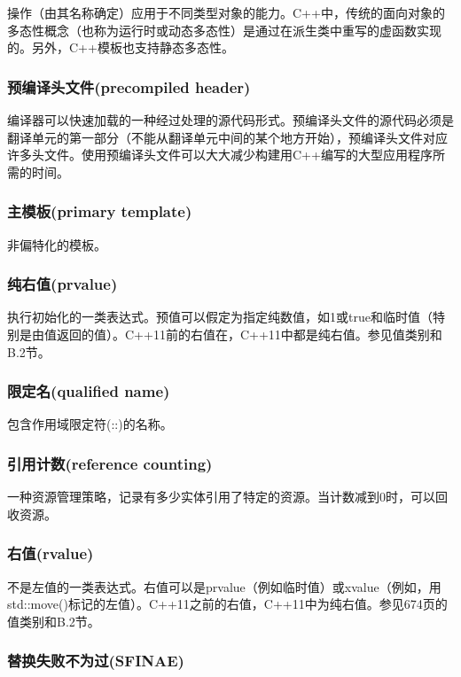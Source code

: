 操作（由其名称确定）应用于不同类型对象的能力。C++中，传统的面向对象的多态性概念（也称为运行时或动态多态性）是通过在派生类中重写的虚函数实现的。另外，C++模板也支持静态多态性。

\subsubsection{预编译头文件(precompiled header)}

编译器可以快速加载的一种经过处理的源代码形式。预编译头文件的源代码必须是翻译单元的第一部分（不能从翻译单元中间的某个地方开始），预编译头文件对应许多头文件。使用预编译头文件可以大大减少构建用C++编写的大型应用程序所需的时间。

\subsubsection{主模板(primary template)}

非偏特化的模板。

\subsubsection{纯右值(prvalue)}

执行初始化的一类表达式。预值可以假定为指定纯数值，如1或true和临时值（特别是由值返回的值）。C++11前的右值在，C++11中都是纯右值。参见值类别和B.2节。

\subsubsection{限定名(qualified name)}

包含作用域限定符(::)的名称。

\subsubsection{引用计数(reference counting)}

一种资源管理策略，记录有多少实体引用了特定的资源。当计数减到0时，可以回收资源。

\subsubsection{右值(rvalue)}

不是左值的一类表达式。右值可以是prvalue（例如临时值）或xvalue（例如，用std::move()标记的左值）。C++11之前的右值，C++11中为纯右值。参见674页的值类别和B.2节。

\subsubsection{替换失败不为过(SFINAE)}

